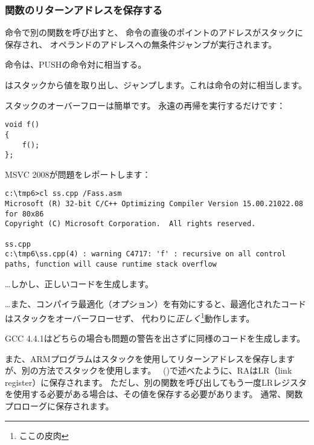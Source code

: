 \subsubsection{関数のリターンアドレスを保存する}


\CALL 命令で別の関数を呼び出すと、 \CALL 命令の直後のポイントのアドレスがスタックに保存され、 
\CALL オペランドのアドレスへの無条件ジャンプが実行されます。

\CALL 命令は、PUSHの命令対に相当する。

\RET はスタックから値を取り出し、ジャンプします。これは命令の対に相当します。

\myindex{\Stack!\MLStackOverflow}
\myindex{\Recursion}
スタックのオーバーフローは簡単です。 永遠の再帰を実行するだけです：


\begin{lstlisting}[style=customc]
void f()
{
	f();
};
\end{lstlisting}

MSVC 2008が問題をレポートします：

\begin{lstlisting}
c:\tmp6>cl ss.cpp /Fass.asm
Microsoft (R) 32-bit C/C++ Optimizing Compiler Version 15.00.21022.08 for 80x86
Copyright (C) Microsoft Corporation.  All rights reserved.

ss.cpp
c:\tmp6\ss.cpp(4) : warning C4717: 'f' : recursive on all control paths, function will cause runtime stack overflow
\end{lstlisting}

\dots しかし、正しいコードを生成します。



\dots また、コンパイラ最適化（\TT{\Ox}オプション）を有効にすると、最適化されたコードはスタックをオーバーフローせず、
代わりに\emph{正しく}\footnote{ここの皮肉}動作します。



GCC 4.4.1はどちらの場合も問題の警告を出さずに同様のコードを生成します。


また、ARMプログラムはスタックを使用してリターンアドレスを保存しますが、別の方法でスタックを使用します。 
\q{\HelloWorldSectionName}~()で述べたように、\ac{RA}は\ac{LR}（\gls{link register}）に保存されます。 
ただし、別の関数を呼び出してもう一度\ac{LR}レジスタを使用する必要がある場合は、その値を保存する必要があります。 
通常、関数プロローグに保存されます。

